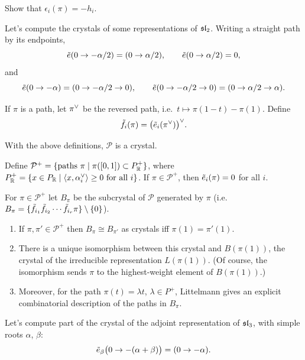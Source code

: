 \begin{exercise}
Show that $\epsilon_i(\pi) = -h_i$.
\end{exercise}

\begin{example}
Let's compute the crystals of some representations of $\sl_2$. Writing a
straight path by its endpoints,
\[
  \te(0 \to -\alpha/2) = (0 \to \alpha/2), \qquad \te(0 \to \alpha/2) = 0,
\]
and
\[
  \te(0 \to -\alpha) = (0 \to -\alpha/2 \to 0), \qquad
  \te(0 \to -\alpha/2 \to 0) = (0 \to \alpha/2 \to \alpha).
\]
\end{example}

If $\pi$ is a path, let $\pi\cv$ be the reversed path, i.e.\
$t \mapsto \pi(1 - t) - \pi(1)$. Define
\[
  \tf_i(\pi) = \bigl(\te_i(\pi\cv)\bigr)\cv.
\]

\begin{exercise}
With the above definitions, $\mathcal{P}$ is a crystal.
\end{exercise}

Define
$\mathcal{P}^+ = \setc{\text{paths } \pi}{\pi([0, 1]) \subset P_\R^+}$, where
$P_\R^+ = \setc{x \in P_\R}{\ip{x}{\alpha_i\cv} \geq 0 \text{ for all } i}$.
If $\pi \in \mathcal{P}^+$, then $\te_i(\pi) = 0$ for all $i$.

For $\pi \in \mathcal{P}^+$ let $B_\pi$ be the subcrystal of $\mathcal{P}$
generated by $\pi$ (i.e.\ $B_\pi = \{\tf_{i_1}\tf_{i_2}\cdots\tf_{i_r}\pi\} \setminus \{0\}$).

\begin{theorem}[Littelmann]\leavevmode
\begin{enumerate}
  \item If $\pi, \pi' \in \mathcal{P}^+$ then $B_\pi \cong B_{\pi'}$ as
    crystals iff $\pi(1) = \pi'(1)$.
  \item There is a unique isomorphism between this crystal and
    $B(\pi(1))$, the crystal of the irreducible representation
    $L(\pi(1))$. (Of course, the isomorphism sends $\pi$ to the highest-weight
    element of $B(\pi(1))$.)
  \item Moreover, for the path $\pi(t) = \lambda t$, $\lambda \in P^+$,
    Littelmann gives an explicit combinatorial description of the paths in
    $B_\pi$.
\end{enumerate}
\end{theorem}

\begin{example}
Let's compute part of the crystal of the adjoint representation of $\sl_3$,
with simple roots $\alpha$, $\beta$:
\[
  \te_\beta\bigl(0 \to -(\alpha + \beta)\bigr) = (0 \to -\alpha).
\]
\end{example}

